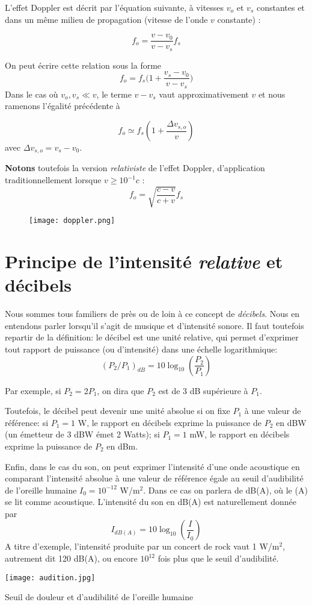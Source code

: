 L'effet Doppler est décrit par l'équation suivante, à vitesses $v_{o}$ et $v_{s}$ constantes et dans un même milieu de propagation (vitesse de l'onde $v$ constante) : 

\[f_{o} = \frac{v-v_{0}}{v-v_{s}}f_{s}\]

On peut écrire cette relation sous la forme
$$ f_{o} = f_s\Big(1+\frac{v_s-v_{0}}{v-v_{s}}\Big)$$
Dans le cas où $v_{o},v_{s} \ll v$, le terme $v-v_s$ vaut approximativement $v$ et nous ramenons l'égalité précédente à 

\[f_{o} \simeq f_{s} (1 + \frac{\Delta v_{s,o}}{v}) \]
avec $\Delta v_{s,o}=v_s-v_0$.

\textbf{Notons} toutefois la version \textit{relativiste} de l'effet Doppler, d'application traditionnellement lorsque $v \geq 10^{-1} c$ : 
\[  f_{o} = \sqrt{\frac{c-v}{c + v}} f_{s}\]

\begin{figure*}
	\texttt{[image: doppler.png]}
\end{figure*}

\section{Principe de l'intensité \textit{relative} et décibels} 

Nous sommes tous familiers de près ou de loin à ce concept de \textit{décibels}. Nous en entendons parler lorsqu'il s'agit de musique et d'intensité sonore. Il faut toutefois repartir de la définition: le décibel est une unité relative, qui permet d'exprimer tout rapport de puissance (ou d'intensité) dans une échelle logarithmique:
\[ (P_2/P_1)_{dB} = 10 \log_{10}\left(\frac{P_2}{P_1}\right) \]

Par exemple, si $P_2 = 2P_1$, on dira que $P_2$ est de 3 dB supérieure à $P_1$. 

Toutefois, le décibel peut devenir une unité absolue si on fixe $P_1$ à une valeur de référence: si $P_1 = 1$ W, le rapport en décibels exprime la puissance de $P_2$ en dBW (un émetteur de 3 dBW émet 2 Watts); si $P_1 = 1$ mW, le rapport en décibels exprime la puissance de $P_2$ en dBm. 

Enfin, dans le cas du son, on peut exprimer l'intensité d'une onde acoustique en comparant l'intensité absolue à une valeur de référence égale au seuil d'audibilité de l'oreille humaine $I_0 = 10^{-12}$ W/m$^2$. Dans ce cas on parlera de dB(A), où le (A) se lit comme acoustique. L'intensité du son en dB(A) est naturellement donnée par 
\[ I_{dB(A)} = 10 \log_{10}\left(\frac{I}{I_{0}}\right) \]
A titre d'exemple, l'intensité produite par un concert de rock vaut 1 W/m$^2$, autrement dit 120 dB(A), ou encore $10^{12}$ fois plus que le seuil d'audibilité. 
\begin{marginfigure}[-5cm]
	\texttt{[image: audition.jpg]}
	\caption{Seuil de douleur et d'audibilité de l'oreille humaine}
\end{marginfigure}
